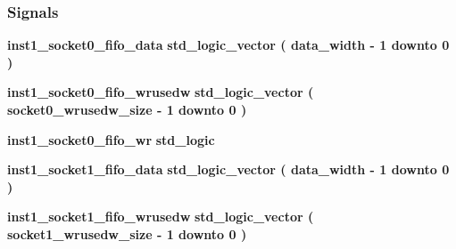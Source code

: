 \subsubsection*{Signals}
 \begin{DoxyCompactItemize}
\item 
{\bf inst1\+\_\+socket0\+\_\+fifo\+\_\+data} {\bfseries \textcolor{comment}{std\+\_\+logic\+\_\+vector}\textcolor{vhdlchar}{ }\textcolor{vhdlchar}{(}\textcolor{vhdlchar}{ }\textcolor{vhdlchar}{ }\textcolor{vhdlchar}{ }\textcolor{vhdlchar}{ }{\bfseries {\bf data\+\_\+width}} \textcolor{vhdlchar}{-\/}\textcolor{vhdlchar}{ } \textcolor{vhdldigit}{1} \textcolor{vhdlchar}{ }\textcolor{keywordflow}{downto}\textcolor{vhdlchar}{ }\textcolor{vhdlchar}{ } \textcolor{vhdldigit}{0} \textcolor{vhdlchar}{ }\textcolor{vhdlchar}{)}\textcolor{vhdlchar}{ }} 
\item 
{\bf inst1\+\_\+socket0\+\_\+fifo\+\_\+wrusedw} {\bfseries \textcolor{comment}{std\+\_\+logic\+\_\+vector}\textcolor{vhdlchar}{ }\textcolor{vhdlchar}{(}\textcolor{vhdlchar}{ }\textcolor{vhdlchar}{ }\textcolor{vhdlchar}{ }\textcolor{vhdlchar}{ }{\bfseries {\bf socket0\+\_\+wrusedw\+\_\+size}} \textcolor{vhdlchar}{-\/}\textcolor{vhdlchar}{ } \textcolor{vhdldigit}{1} \textcolor{vhdlchar}{ }\textcolor{keywordflow}{downto}\textcolor{vhdlchar}{ }\textcolor{vhdlchar}{ } \textcolor{vhdldigit}{0} \textcolor{vhdlchar}{ }\textcolor{vhdlchar}{)}\textcolor{vhdlchar}{ }} 
\item 
{\bf inst1\+\_\+socket0\+\_\+fifo\+\_\+wr} {\bfseries \textcolor{comment}{std\+\_\+logic}\textcolor{vhdlchar}{ }} 
\item 
{\bf inst1\+\_\+socket1\+\_\+fifo\+\_\+data} {\bfseries \textcolor{comment}{std\+\_\+logic\+\_\+vector}\textcolor{vhdlchar}{ }\textcolor{vhdlchar}{(}\textcolor{vhdlchar}{ }\textcolor{vhdlchar}{ }\textcolor{vhdlchar}{ }\textcolor{vhdlchar}{ }{\bfseries {\bf data\+\_\+width}} \textcolor{vhdlchar}{-\/}\textcolor{vhdlchar}{ } \textcolor{vhdldigit}{1} \textcolor{vhdlchar}{ }\textcolor{keywordflow}{downto}\textcolor{vhdlchar}{ }\textcolor{vhdlchar}{ } \textcolor{vhdldigit}{0} \textcolor{vhdlchar}{ }\textcolor{vhdlchar}{)}\textcolor{vhdlchar}{ }} 
\item 
{\bf inst1\+\_\+socket1\+\_\+fifo\+\_\+wrusedw} {\bfseries \textcolor{comment}{std\+\_\+logic\+\_\+vector}\textcolor{vhdlchar}{ }\textcolor{vhdlchar}{(}\textcolor{vhdlchar}{ }\textcolor{vhdlchar}{ }\textcolor{vhdlchar}{ }\textcolor{vhdlchar}{ }{\bfseries {\bf socket1\+\_\+wrusedw\+\_\+size}} \textcolor{vhdlchar}{-\/}\textcolor{vhdlchar}{ } \textcolor{vhdldigit}{1} \textcolor{vhdlchar}{ }\textcolor{keywordflow}{downto}\textcolor{vhdlchar}{ }\textcolor{vhdlchar}{ } \textcolor{vhdldigit}{0} \textcolor{vhdlchar}{ }\textcolor{vhdlchar}{)}\textcolor{vhdlchar}{ }} 

\end{DoxyCompactItemize}
